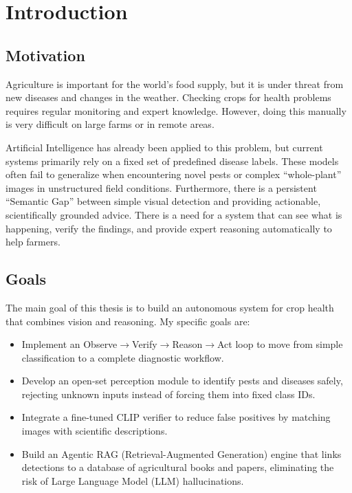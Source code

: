 \chapter{Introduction}
\label{chap:intro}
\thispagestyle{open}

\section{Motivation}
Agriculture is important for the world's food supply, but it is under threat from new diseases and changes in the weather. Checking crops for health problems requires regular monitoring and expert knowledge. However, doing this manually is very difficult on large farms or in remote areas.

Artificial Intelligence has already been applied to this problem, but current systems primarily rely on a fixed set of predefined disease labels. These models often fail to generalize when encountering novel pests or complex ``whole-plant'' images in unstructured field conditions. Furthermore, there is a persistent ``Semantic Gap'' between simple visual detection and providing actionable, scientifically grounded advice. There is a need for a system that can see what is happening, verify the findings, and provide expert reasoning automatically to help farmers.

\section{Goals}
The main goal of this thesis is to build an autonomous system for crop health that combines vision and reasoning. My specific goals are: 
\begin{itemize} 
	\item Implement an Observe$\rightarrow$Verify$\rightarrow$Reason$\rightarrow$Act loop to move from simple classification to a complete diagnostic workflow. 
	\item Develop an open-set perception module to identify pests and diseases safely, rejecting unknown inputs instead of forcing them into fixed class IDs.
	\item Integrate a fine-tuned CLIP verifier to reduce false positives by matching images with scientific descriptions. 
	\item Build an Agentic RAG (Retrieval-Augmented Generation) engine that links detections to a database of agricultural books and papers, eliminating the risk of Large Language Model (LLM) hallucinations. 
\end{itemize}

